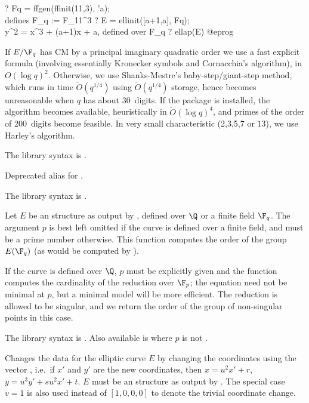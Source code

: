 ? Fq = ffgen(ffinit(11,3), 'a); \\ defines F_q := F_{11^3}
? E = ellinit([a+1,a], Fq);  \\ y^2 = x^3 + (a+1)x + a, defined over F_q
? ellap(E)
@eprog

 If $E/\F_q$ has CM by a principal imaginary
quadratic order we use a fast explicit formula (involving essentially Kronecker
symbols and Cornacchia's algorithm), in $O(\log q)^2$.
Otherwise, we use Shanks-Mestre's baby-step/giant-step method, which runs in
time $\tilde{O}(q^{1/4})$ using $\tilde{O}(q^{1/4})$ storage, hence becomes
unreasonable when $q$ has about 30~digits. If the  package is
installed, the  algorithm becomes available, heuristically in
$\tilde{O}(\log q)^4$, and primes of the order of 200~digits become feasible.
In very small characteristic (2,3,5,7 or $13$), we use Harley's algorithm.

The library syntax is .

\label{se:ellbil}
Deprecated alias for .

The library syntax is .

\label{se:ellcard}
Let $E$ be an  structure as output by , defined over
$\Q$ or a finite field $\F_q$. The argument $p$ is best left omitted if the
curve is defined over a finite field, and must be a prime number otherwise.
This function computes the order of the group $E(\F_q)$ (as would be
computed by ).

If the curve is defined over $\Q$, $p$ must be explicitly given and the
function computes the cardinality of the reduction over $\F_p$; the
equation need not be minimal at $p$, but a minimal model will be more
efficient. The reduction is allowed to be singular, and we return the order
of the group of non-singular points in this case.

The library syntax is .
Also available is  where $p$ is not
.

\label{se:ellchangecurve}
Changes the data for the elliptic curve $E$
by changing the coordinates using the vector , i.e.~if $x'$
and $y'$ are the new coordinates, then $x=u^2x'+r$, $y=u^3y'+su^2x'+t$.
$E$ must be an  structure as output by . The special
case $v = 1$ is also used instead of $[1,0,0,0]$ to denote the
trivial coordinate change.

